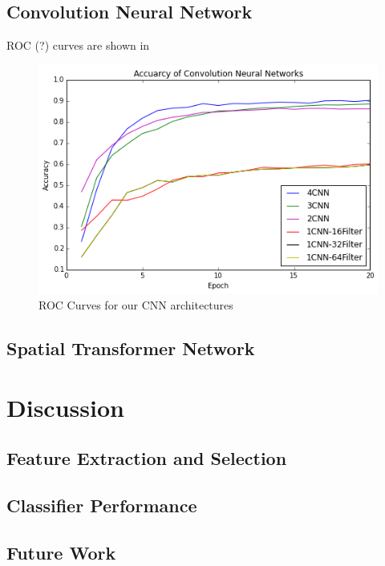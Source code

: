 \documentclass[conference]{IEEEtran}
\begin{document}
\subsection{Convolution Neural Network}
ROC (?) curves are shown in \label{CNN-ROC}

\begin{figure}[h]
	\centering
	\includegraphics[scale=0.6]{acc.png}
	\caption{ROC Curves for our CNN architectures}
	\label{CNN-ROC}
\end{figure}


\subsection{Spatial Transformer Network}



\section{Discussion}

\subsection{Feature Extraction and Selection}



\subsection{Classifier Performance}

\subsection{Future Work}
\end{document}

